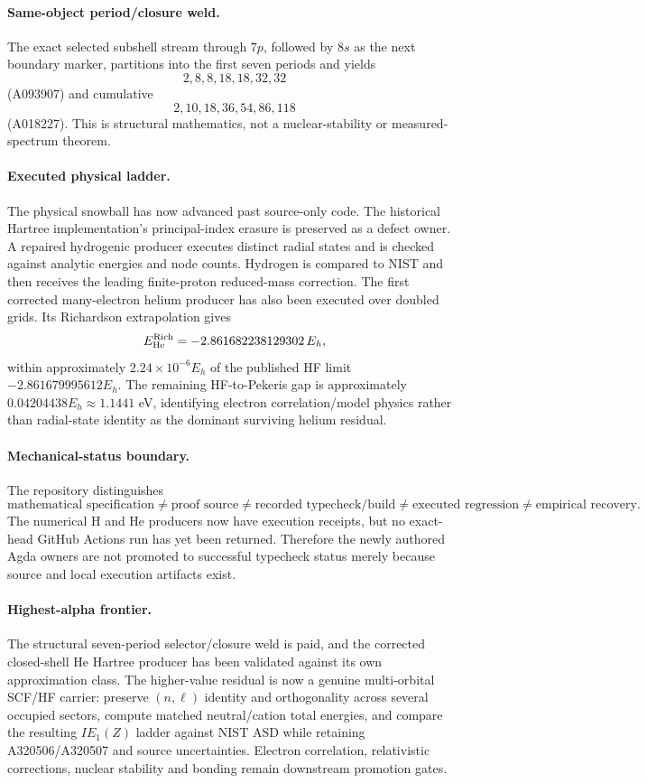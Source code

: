\paragraph{Same-object period/closure weld.}
The exact selected subshell stream through $7p$, followed by $8s$ as the next
boundary marker, partitions into the first seven periods and yields
\[
2,8,8,18,18,32,32
\]
(A093907) and cumulative
\[
2,10,18,36,54,86,118
\]
(A018227). This is structural mathematics, not a nuclear-stability or measured-
spectrum theorem.

\paragraph{Executed physical ladder.}
The physical snowball has now advanced past source-only code. The historical
Hartree implementation's principal-index erasure is preserved as a defect owner.
A repaired hydrogenic producer executes distinct radial states and is checked
against analytic energies and node counts. Hydrogen is compared to NIST and then
receives the leading finite-proton reduced-mass correction. The first corrected
many-electron helium producer has also been executed over doubled grids. Its
Richardson extrapolation gives
\[
E_{\rm He}^{\rm Rich}=-2.861682238129302\,E_h,
\]
within approximately $2.24\times10^{-6}E_h$ of the published HF limit
$-2.861679995612E_h$. The remaining HF-to-Pekeris gap is approximately
$0.04204438E_h\approx1.1441$ eV, identifying electron correlation/model physics
rather than radial-state identity as the dominant surviving helium residual.

\paragraph{Mechanical-status boundary.}
The repository distinguishes
\[
\text{mathematical specification}
\neq\text{proof source}
\neq\text{recorded typecheck/build}
\neq\text{executed regression}
\neq\text{empirical recovery}.
\]
The numerical H and He producers now have execution receipts, but no exact-head
GitHub Actions run has yet been returned. Therefore the newly authored Agda
owners are not promoted to successful typecheck status merely because source and
local execution artifacts exist.

\paragraph{Highest-alpha frontier.}
The structural seven-period selector/closure weld is paid, and the corrected
closed-shell He Hartree producer has been validated against its own approximation
class. The higher-value residual is now a genuine multi-orbital SCF/HF carrier:
preserve $(n,\ell)$ identity and orthogonality across several occupied sectors,
compute matched neutral/cation total energies, and compare the resulting
$IE_1(Z)$ ladder against NIST ASD while retaining A320506/A320507 and source
uncertainties. Electron correlation, relativistic corrections, nuclear stability
and bonding remain downstream promotion gates.
